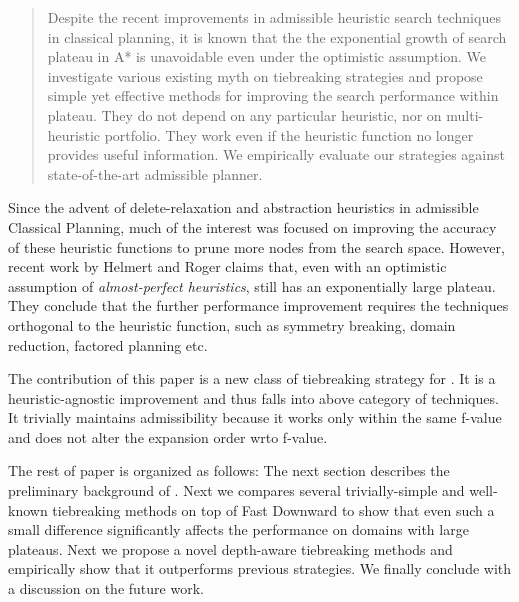 \begin{abstract}
Despite the recent improvements in admissible heuristic search techniques
in classical planning, it is known that the the exponential growth of
search plateau in A* is unavoidable even under the optimistic assumption.
We investigate various existing myth on tiebreaking
 strategies and propose simple yet effective methods for improving the
 search performance within plateau.
 They do not depend on any particular heuristic, nor
 on multi-heuristic portfolio.
 They work even if the heuristic
 function no longer provides useful information.
 We empirically evaluate our strategies against state-of-the-art admissible planner.
\end{abstract}

Since the advent of delete-relaxation and abstraction heuristics in
admissible Classical Planning, much of the interest was focused on improving
the accuracy of these heuristic functions to prune more nodes from the
search space.
% 
However, recent work by Helmert and Roger
 claims that, even with an optimistic
assumption of \emph{almost-perfect heuristics}, \astar still has an
exponentially large plateau. They conclude that the further performance
improvement requires the techniques orthogonal to the heuristic
function, such as symmetry breaking, domain reduction, factored planning
etc.

The contribution of this paper is a new class of
tiebreaking strategy for \astar.
It is a heuristic-agnostic improvement and thus 
falls into above category of techniques.
It trivially maintains admissibility because it works only within the
same f-value and does not alter the expansion order wrto f-value.



The rest of paper is organized as follows: The next section describes the
preliminary background of \astar.
Next we compares several trivially-simple and well-known tiebreaking
methods on top of Fast Downward to show that even such a small
difference significantly affects the performance on domains with
large plateaus.
Next we propose a novel depth-aware tiebreaking methods and empirically
show that it outperforms previous strategies.
We finally conclude with a discussion on the future work.


